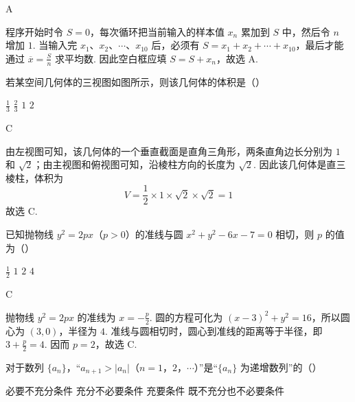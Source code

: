 \begin{answer}
A
\end{answer}

\begin{solution}
程序开始时令 \(S=0\)，每次循环把当前输入的样本值 \(x_n\) 累加到 \(S\) 中，然后令 \(n\) 增加 \(1\). 当输入完 \(x_1\)、\(x_2\)、\(\cdots\)、\(x_{10}\) 后，必须有 \(S=x_1+x_2+\cdots+x_{10}\)，最后才能通过 \(\overline{x}=\frac{S}{n}\) 求平均数. 因此空白框应填 \(S=S+x_n\)，故选 A.
\end{solution}

\begin{problem}
若某空间几何体的三视图如图所示，则该几何体的体积是（\quad）


\choices
    {\(\frac{1}{3}\)}
    {\(\frac{2}{3}\)}
    {\(1\)}
    {\(2\)}
\end{problem}

\begin{answer}
C
\end{answer}

\begin{solution}
由左视图可知，该几何体的一个垂直截面是直角三角形，两条直角边长分别为 \(1\) 和 \(\sqrt{2}\)；由主视图和俯视图可知，沿棱柱方向的长度为 \(\sqrt{2}\). 因此该几何体是直三棱柱，体积为
\[
V=\frac12\times1\times\sqrt{2}\times\sqrt{2}=1
\]
故选 C.
\end{solution}

\begin{problem}
已知抛物线 \(y^2 = 2px\)（\(p > 0\)）的准线与圆 \(x^2 + y^2 - 6x - 7 = 0\) 相切，则 \(p\) 的值为（\quad）

\choices
    {\(\frac{1}{2}\)}
    {\(1\)}
    {\(2\)}
    {\(4\)}
\end{problem}

\begin{answer}
C
\end{answer}

\begin{solution}
抛物线 \(y^2=2px\) 的准线为 \(x=-\frac p2\). 圆的方程可化为 \((x-3)^2+y^2=16\)，所以圆心为 \((3,0)\)，半径为 \(4\). 准线与圆相切时，圆心到准线的距离等于半径，即 \(3+\frac p2=4\). 因而 \(p=2\)，故选 C.
\end{solution}

\begin{problem}
对于数列 \(\{a_n\}\)，“\(a_{n+1} > |a_n|\)（\(n = 1\)，\(2\)，\(\cdots\)）”是“\(\{a_n\}\) 为递增数列”的（\quad）

\choices
    {必要不充分条件}
    {充分不必要条件}
    {充要条件}
    {既不充分也不必要条件}
\end{problem}

